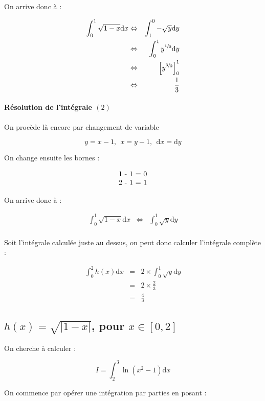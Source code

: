 \documentclass[a4paper, 11pt]{report} %
\newcommand{\dx}{\mathrm{d}x}
\newcommand{\dy}{\mathrm{d}y}
\begin{document}
On arrive donc à :

\begin{eqnarray*}
\int_0^1\sqrt{1-x}\dx & \Leftrightarrow & \int_1^0 - \sqrt{y}\dy\\
& \Leftrightarrow & \int_0^1y^{\nicefrac{1}{2}}\dy \\
& \Leftrightarrow & \left[y^{\nicefrac{3}{2}}\right]_0^1 \\
& \Leftrightarrow & \frac{1}{3}
\end{eqnarray*}

\paragraph{Résolution de l'intégrale $(2)$}

On procède là encore par changement de variable

\[ y = x - 1, ~~ x = y - 1, ~~ \dx = \dy \]

On change ensuite les bornes :

\[ \begin{tabular}{c}
    1 - 1 = 0\\
    2 - 1 = 1
\end{tabular}
\]

On arrive donc à :

\begin{eqnarray*}
\int_0^1\sqrt{1-x}\dx & \Leftrightarrow & \int_0^1 \sqrt{y}\dy\\
\end{eqnarray*}

Soit l'intégrale calculée juste au dessus, on peut donc calculer l'intégrale complète :

\begin{eqnarray*}
\int_0^2h(x)\dx & = & 2\times\int_0^1\sqrt{y}\dy\\
& = & 2\times \frac{2}{3}\\
& = & \frac{4}{3}
\end{eqnarray*}


\subsection{$h(x) = \sqrt{\left|1-x\right|}$, pour $x\in[0, 2]$} %

On cherche à calculer :

\[
I = \int_2^3\ln(x^2-1)\dx
\]

On commence par opérer une intégration par parties en posant :
\end{document}
